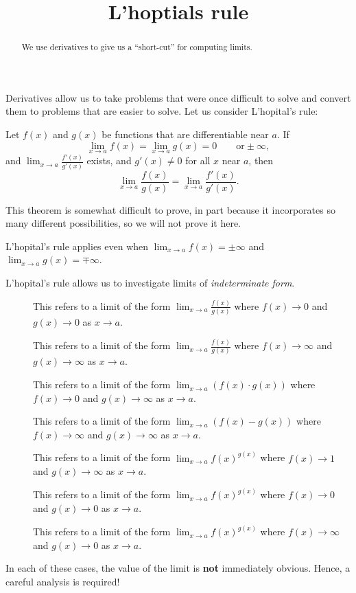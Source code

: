 \documentclass{ximera}
\title[Dig-In:]{L'hoptials rule}
\begin{document}
\begin{abstract}
  We use derivatives to give us a ``short-cut'' for computing limits.
\end{abstract}
\maketitle

Derivatives allow us to take problems that were once difficult to
solve and convert them to problems that are easier to solve. Let us
consider L'hopital's rule:

\begin{theorem} 
Let $f(x)$ and $g(x)$ be functions that are differentiable near $a$.  If
\[
\lim_{x \to a} f(x) = \lim_{x \to a}g(x) = 0 \qquad \text{or} \pm \infty,
\]
and $\lim_{x \to a} \frac{f'(x)}{g'(x)}$ exists, and $g'(x) \neq 0$
for all $x$ near $a$, then 
\[
\lim_{x \to a} \frac{f(x)}{g(x)} = \lim_{x \to a} \frac{f'(x)}{g'(x)}.
\]
\end{theorem}

This theorem is somewhat difficult to prove, in part because it
incorporates so many different possibilities, so we will not prove it
here. 
\begin{remark}
  L'hopital's rule applies even when $\lim_{x\to a}f(x) = \pm \infty$
  and $\lim_{x\to a}g(x) = \mp \infty$.
\end{remark}


L'hopital's rule allows us to investigate limits of
\textit{indeterminate form}.

\begin{definition}\hfil
\begin{description}
\item[\zeroOverZero] This refers to a limit of the form $\lim_{x\to a}
  \frac{f(x)}{g(x)}$ where $f(x)\to 0$ and $g(x)\to 0$ as $x\to a$.
\item[\inftyOverInfty] This refers to a limit of the form $\lim_{x\to a}
  \frac{f(x)}{g(x)}$ where $f(x)\to \infty$ and $g(x)\to \infty$ as $x\to a$.
\item[\zeroTimesInfty] This refers to a limit of the form $\lim_{x\to a}
  \left(f(x)\cdot g(x)\right)$ where $f(x)\to 0$ and $g(x)\to \infty$ as $x\to a$.
\item[\inftyMinusInfty] This refers to a limit of the form $\lim_{x\to a}\left(
  f(x)-g(x)\right)$ where $f(x)\to \infty$ and $g(x)\to \infty$ as $x\to a$.
\item[\oneToInfty] This refers to a limit of the form $\lim_{x\to a}
  f(x)^{g(x)}$ where $f(x)\to 1$ and $g(x)\to \infty$ as $x\to a$.
\item[\zeroToZero] This refers to a limit of the form $\lim_{x\to a}
  f(x)^{g(x)}$ where $f(x)\to 0$ and $g(x)\to 0$ as $x\to a$.
\item[\inftyToZero] This refers to a limit of the form $\lim_{x\to a}
  f(x)^{g(x)}$ where $f(x)\to \infty$ and $g(x)\to 0$ as $x\to a$.
\end{description}
In each of these cases, the value of the limit is \textbf{not} immediately
obvious. Hence, a careful analysis is required!
\end{definition}
\end{document}
